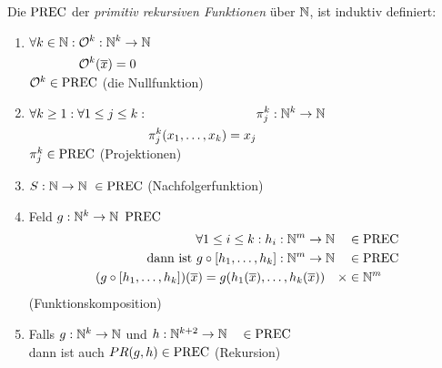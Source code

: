 \begin{Def}[name={[$\PREC$ primitiv rekursiven Funktionen über $\N$]}]\label{def:PREC}
	Die $\PREC$ der \emph{primitiv rekursiven Funktionen} über $\N$, ist induktiv definiert:
	\begin{enumerate}
	\item\label{itm:Nullfunktion} $\forall k\in\N:
		\begin{aligned}[t]
			&\mathcal{O}^k : \N^k\->\N\\
			&\mathcal{O}^k(\overline{x}) = 0\\
		\end{aligned}$\\
		$\mathcal{O}^k\in\operatorname{PREC}$ (die Nullfunktion)
	\item\label{itm:Projektion} $\forall k\geq1: \forall 1\leq j\leq k:
		\begin{aligned}[t]
			&\pi^k_j : \N^k\->\N\\
			\pi^k_j(x_1,\dots,x_k) = x_j
		\end{aligned}$\\
		$\pi^k_j\in\operatorname{PREC}$ (Projektionen)
	\item\label{itm:Nachfolgerfunktion} $S:\N\->\N\ \in\PREC$ (Nachfolgerfunktion)
	\pagebreak[3]
	\item\label{itm:Komposition} Feld $g:\N^k\->\N\ \PREC$
		\begin{align*}
			\forall 1\leq i\leq k: h_i:\N^m\->\N \quad&\in\PREC\\
			\text{dann ist }g\circ[h_1,\dots,h_k]:\N^m\->\N \quad&\in\PREC\\
			(g\circ[h_1,\dots,h_k])(\overline{x}) = g(h_1(\overline{x}),\dots,h_k(\overline{x})) \quad\x&\in\N^m
		\end{align*}
		(Funktionskomposition)
	\item\label{itm:Rekursion} Falls $g:\N^k\->\N$ und $h:\N^{k+2}\->\N\quad\in\PREC$\\
		dann ist auch $PR(g,h)\in\operatorname{PREC}$ \quad(Rekursion) \qedhere
	\end{enumerate}
\end{Def}
